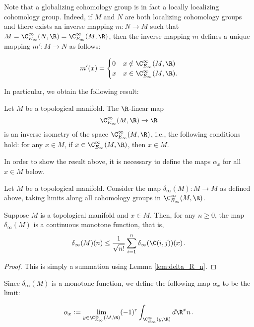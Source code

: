 \documentclass[a4paper,reqno,oneside]{article}
\begin{document}
Note that a globalizing cohomology group is in fact a locally localizing cohomology group. Indeed, if $M$ and $N$ are both localizing cohomology groups and there exists an inverse mapping $m: N \to M$ such that $M = \C^{\infty}_{E_\infty}(N, \R) = \C^{\infty}_{E_\infty}(M, \R)$, then the inverse mapping $m$ defines a unique mapping $m': M \to N$ as follows:

\[
    m'(x) = \begin{cases}
        0 & x \notin \C^{\infty}_{E_\infty}(M, \R) \\
        x & x \in \C^{\infty}_{E_\infty}(M, \R).
    \end{cases}
\]

In particular, we obtain the following result:

\begin{corollary}\label{cor:topol_localizing_cohomology_group}
    Let $M$ be a topological manifold. The $\R$-linear map
    \[
        \C^{\infty}_{E_\infty}(M, \R) \to \R
    \]
    is an inverse isometry of the space $\C^{\infty}_{E_\infty}(M, \R)$, i.e., the following conditions hold: for any $x \in M$, if $x \in \C^{\infty}_{E_\infty}(M, \R)$, then $x \in M$.
\end{corollary}

In order to show the result above, it is necessary to define the maps $\alpha_x$ for all $x \in M$ below.

\begin{notation}
    Let $M$ be a topological manifold. Consider the map $\delta_{\infty}(M): M \to M$ as defined above, taking limits along all cohomology groups in $\C^{\infty}_{E_\infty}(M, \R)$.
\end{notation}

\begin{lemma}
    Suppose $M$ is a topological manifold and $x \in M$. Then, for any $n \ge 0$, the map $\delta_{\infty}(M)$ is a continuous monotone function, that is,
    \[
        \delta_{\infty}(M)(n) \leq \frac{1}{\sqrt{n!}} \sum_{i=1}^{n} \delta_{\infty}(\C(i, j))(x) \,.
    \]
\end{lemma}

\begin{proof}
    This is simply a summation using Lemma \ref{lem:delta_R_n}.
\end{proof}

Since $\delta_{\infty}(M)$ is a monotone function, we define the following map $\alpha_x$ to be the limit:

\[
    \alpha_x := \lim_{y \in \C^{\infty}_{E_\infty}(M, \R)} (-1)^r \int_{\C^{\infty}_{E_\infty}(y, \R)} d\R^xn \,.
\]
\end{document}

